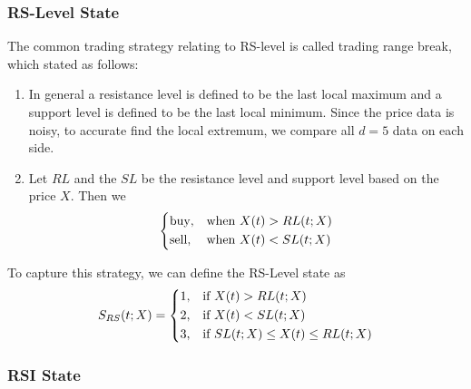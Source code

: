 \documentclass[11pt,a4paper]{article}
\numberwithin{equation}{section}
\begin{document}
\subsubsection{RS-Level State}

The common trading strategy relating to RS-level is called trading range break, which stated as follows:
\begin{enumerate}
  \item In general a resistance level is defined to be the last local maximum and a support level is defined to be the last local minimum. Since the price data is noisy, to accurate find the local extremum, we compare all $d = 5$ data on each side.
  \item Let $RL$ and the $SL$ be the resistance level and support level based on the price $X$. Then we
        \begin{align}
          \begin{dcases}
            \text{buy},  & \text{when $X(t) > RL(t; X)$} \\
            \text{sell}, & \text{when $X(t) < SL(t; X)$}
          \end{dcases}
        \end{align}
\end{enumerate}

To capture this strategy, we can define the RS-Level state as
\begin{align}
  S_{RS} (t; X) =
  \begin{dcases}
    1, & \text{if $X(t) > RL(t; X)$}                  \\
    2, & \text{if $X(t) < SL(t; X)$}                  \\
    3, & \text{if $SL(t; X) \leq X(t) \leq RL(t; X)$} \\
  \end{dcases}
\end{align}

\subsubsection{RSI State}
\end{document}
